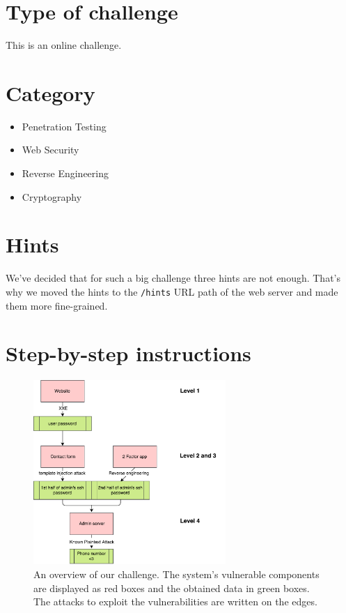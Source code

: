 \documentclass[11pt, a4paper]{article}
\begin{document}
\section{Type of challenge}

This is an online challenge.

\section{Category}

\begin{itemize}
  \item Penetration Testing
  \item Web Security
  \item Reverse Engineering
  \item Cryptography
\end{itemize}

\section{Hints}

We've decided that for such a big challenge three hints are not enough. That's
why we moved the hints to the \texttt{/hints} URL path of the web server
and made them more fine-grained.

\section{Step-by-step instructions}

\begin{figure}
    \begin{center}
    \includegraphics[width=0.65\textwidth]{images/diagram}
    \end{center}
    \caption{An overview of our challenge. The system's vulnerable components
    are displayed as red boxes and the obtained data in green boxes. The attacks
    to exploit the vulnerabilities are written on the edges.}
    \label{fig:diag}
\end{figure}
\end{document}
